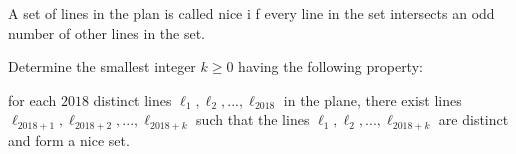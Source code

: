 A set of lines in the plan is called nice i f every line in the set intersects an odd number of other lines in the set.

Determine the smallest integer $k \ge  0$ having the following property:

for each $2018$ distinct lines $\ell_1, \ell_2, ..., \ell_{2018}$ in the plane, there exist lines $\ell_{2018+1},\ell_{2018+2}, . . . , \ell_{2018+k}$ such that the lines $\ell_1, \ell_2, ..., \ell_{2018+k}$ are distinct and form a nice  set.